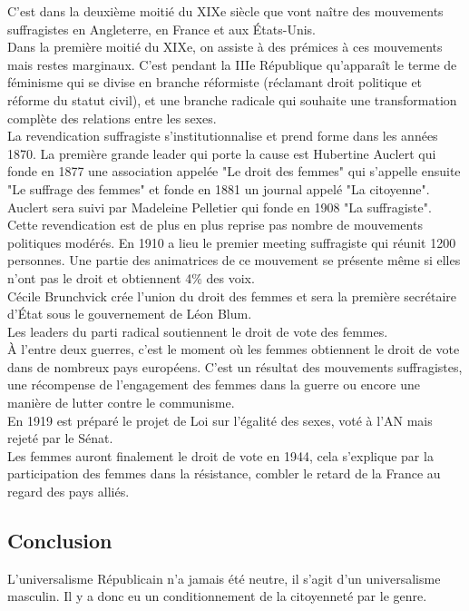 \documentclass[10pt, a4paper, openany]{book}
\begin{document}
C'est dans la deuxième moitié du XIXe siècle que vont naître des mouvements suffragistes en Angleterre, en France et aux États-Unis. \\
Dans la première moitié du XIXe, on assiste à des prémices à ces mouvements mais restes marginaux. C'est pendant la IIIe République qu'apparaît le terme de féminisme qui se divise en branche réformiste (réclamant droit politique et réforme du statut civil), et une branche radicale qui souhaite une transformation complète des relations entre les sexes. \\
La revendication suffragiste s'institutionnalise et prend forme dans les années 1870. La première grande leader qui porte la cause est Hubertine Auclert qui fonde en 1877 une association appelée "Le droit des femmes" qui s'appelle ensuite "Le suffrage des femmes" et fonde en 1881 un journal appelé "La citoyenne". \\
Auclert sera suivi par Madeleine Pelletier qui fonde en 1908 "La suffragiste". Cette revendication est de plus en plus reprise pas nombre de mouvements politiques modérés. En 1910 a lieu le premier meeting suffragiste qui réunit 1200 personnes. Une partie des animatrices de ce mouvement se présente même si elles n'ont pas le droit et obtiennent 4\% des voix. \\
Cécile Brunchvick crée l'union du droit des femmes et sera la première secrétaire d'État sous le gouvernement de Léon Blum. \\
Les leaders du parti radical soutiennent le droit de vote des femmes. \\
À l'entre deux guerres, c'est le moment où les femmes obtiennent le droit de vote dans de nombreux pays européens. C'est un résultat des mouvements suffragistes, une récompense de l'engagement des femmes dans la guerre ou encore une manière de lutter contre le communisme. \\
En 1919 est préparé le projet de Loi sur l'égalité des sexes, voté à l'AN mais rejeté par le Sénat. \\
Les femmes auront finalement le droit de vote en 1944, cela s'explique par la participation des femmes dans la résistance, combler le retard de la France au regard des pays alliés.  

\subsection{Conclusion}

L'universalisme Républicain n'a jamais été neutre, il s'agit d'un universalisme masculin. Il y a donc eu un conditionnement de la citoyenneté par le genre.
\end{document}
